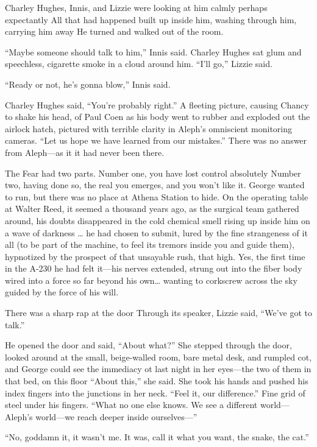 Charley Hughes, Innis, and Lizzie were looking at him calmly perhaps expectantly All that had happened built up inside him, washing through him, carrying him away He turned and walked out of the room.

“Maybe someone should talk to him,” Innis said. Charley Hughes sat glum and speechless, cigarette smoke in a cloud around him. “I’ll go,” Lizzie said.

“Ready or not, he’s gonna blow,” Innis said.

Charley Hughes said, “You’re probably right.” A fleeting picture, causing Chancy to shake his head, of Paul Coen as his body went to rubber and exploded out the airlock hatch, pictured with terrible clarity in Aleph’s omniscient monitoring cameras. “Let us hope we have learned from our mistakes.”
There was no answer from Aleph—as it it had never been there.

The Fear had two parts. Number one, you have lost control absolutely Number two, having done so, the real you emerges, and you won’t like it. George wanted to run, but there was no place at Athena Station to hide. On the operating table at Walter Reed, it seemed a thousand years ago, as the surgical team gathered around, his doubts disappeared in the cold chemical smell rising up inside him on a wave of darkness … he had chosen to submit, lured by the fine strangeness of it all (to be part of the machine, to feel its tremors inside you and guide them), hypnotized by the prospect of that unsayable rush, that high. Yes, the first time in the A-230 he had felt it—his nerves extended, strung out into the fiber body wired into a force so far beyond his own… wanting to corkscrew across the sky guided by the force of his will.

There was a sharp rap at the door Through its speaker, Lizzie said, “We’ve got to talk.”

He opened the door and said, “About what?” She stepped through the door, looked around at the small, beige-walled room, bare metal desk, and rumpled cot, and George could see the immediacy ot last night in her eyes—the two of them in that bed, on this floor “About this,” she said. She took his hands and pushed his index fingers into the junctions in her neck. “Feel it, our difference.” Fine grid of steel under his fingers. “What no one else knows. We see a different world—Aleph’s world—we reach deeper inside ourselves—”

“No, goddamn it, it wasn’t me. It was, call it what you want, the snake, the cat.”

